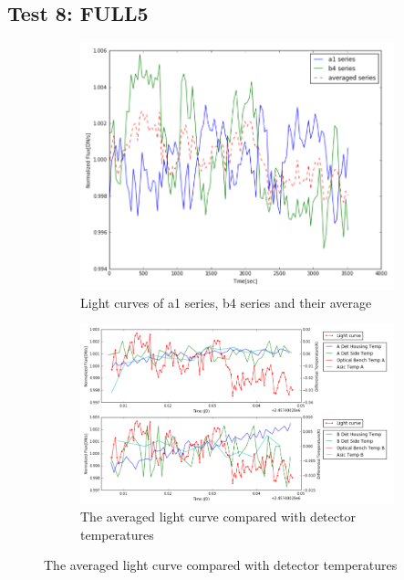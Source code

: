 \documentclass{aastex6}
\begin{document}
\subsection{Test 8: FULL5} 
\begin{figure}[H]
    \centering
    \begin{subfigure}{1}
        \includegraphics[scale=0.4]{ts_test8}
        \caption{Light curves of a1 series, b4 series and their average}
    \end{subfigure}

    \begin{subfigure}{2}
        \includegraphics[scale=0.4]{temp_test8}
        \caption{The averaged light curve compared with detector temperatures}
    \end{subfigure}
   

\end{figure}
\end{document}
